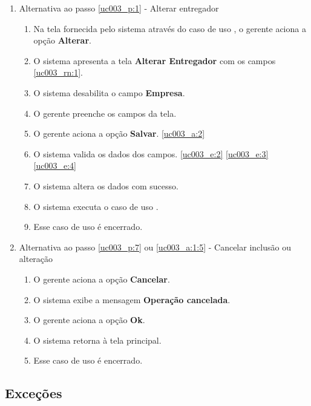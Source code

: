 \begin{enumerate}[label=A\arabic*]
	\item Alternativa ao passo \ref{uc003_p:1} - Alterar entregador \label{uc003_a:1}
	\begin{enumerate}[label*=.\arabic*]
		\item Na tela fornecida pelo sistema através do caso de uso , o gerente aciona a opção \textbf{Alterar}. 
		\item O sistema apresenta a tela \textbf{Alterar Entregador} com os campos \ref{uc003_rn:1}. \label{uc003_a:1:2}
		\item O sistema desabilita o campo \textbf{Empresa}.
		\item O gerente preenche os campos da tela. \label{uc003_a:1:4}
		\item O gerente aciona a opção \textbf{Salvar}. \label{uc003_a:1:5}\ref{uc003_a:2}
		\item O sistema valida os dados dos campos. \ref{uc003_e:2} \ref{uc003_e:3} \ref{uc003_e:4}
		\item O sistema altera os dados com sucesso.
		\item O sistema executa o caso de uso .
		\item Esse caso de uso é encerrado.
	\end{enumerate}
	
	\item Alternativa ao passo \ref{uc003_p:7} ou \ref{uc003_a:1:5} - Cancelar inclusão ou alteração \label{uc003_a:2}
	\begin{enumerate}[label*=.\arabic*]
		\item O gerente aciona a opção \textbf{Cancelar}.
		\item O sistema exibe a mensagem \textbf{Operação cancelada}.
		\item O gerente aciona a opção \textbf{Ok}.
		\item O sistema retorna à tela principal.
		\item Esse caso de uso é encerrado.
	\end{enumerate} 	
\end{enumerate}

\subsection{Exceções}

